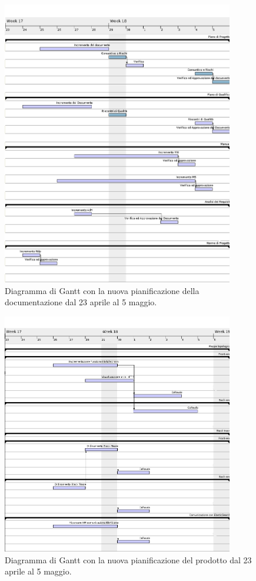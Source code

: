 \begin{figure}[H] 
	\centering 
	\includegraphics[width=0.9\textwidth]{images/sweeftydocs.png} 
	\caption{Diagramma di Gantt con la nuova pianificazione della documentazione dal 23 aprile al 5 maggio.}
	\label{GanttDocs}
\end{figure}

\begin{figure}[H] 
	\centering 
	\includegraphics[width=0.9\textwidth]{images/sweeftycode.png} 
	\caption{Diagramma di Gantt con la nuova pianificazione del prodotto dal 23 aprile al 5 maggio.}
	\label{GanttCode}
\end{figure}




